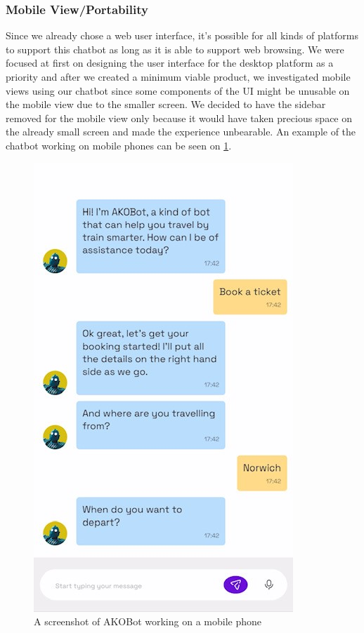 \documentclass[11pt]{article}
\begin{document}
        \subsubsection{Mobile View/Portability}
        Since we already chose a web user interface, it's possible for all kinds of platforms to support this chatbot as long as it is able to support web browsing. We were focused at first on designing the user interface for the desktop platform as a priority and after we created a minimum viable product, we investigated mobile views using our chatbot since some components of the UI might be unusable on the mobile view due to the smaller screen. We decided to have the sidebar removed for the mobile view only because it would have taken precious space on the already small screen and made the experience unbearable. An example of the chatbot working on mobile phones can be seen on \cref{fig:mobileAKOBotPic}.
        
\begin{figure}[!ht]
    \centering
    \includegraphics{MobileViewAkobot.jpg}
    \caption{A screenshot of AKOBot working on a mobile phone}
    \label{fig:mobileAKOBotPic}
\end{figure}
\end{document}
